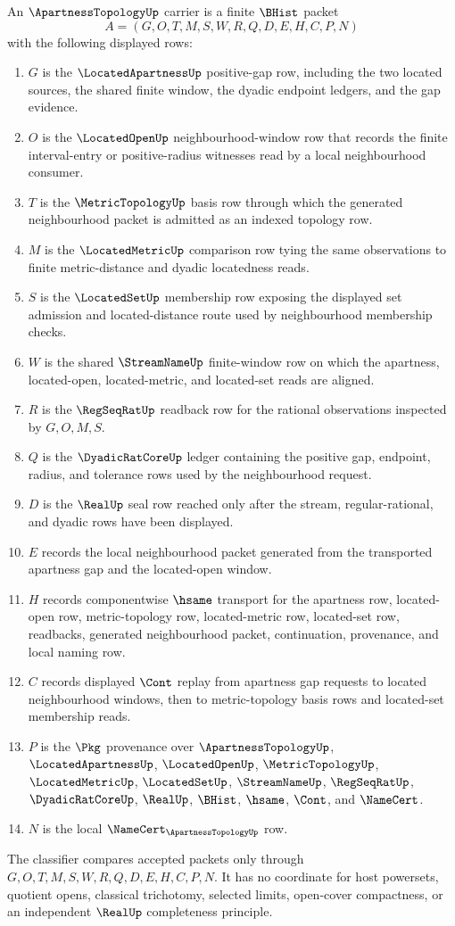 \begin{definition}
\label{def:apartnesstopology-carrier}
An $\ApartnessTopologyUp$ carrier is a finite $\BHist$ packet
$$
A=(G,O,T,M,S,W,R,Q,D,E,H,C,P,N)
$$
with the following displayed rows:
\begin{enumerate}
\item $G$ is the $\LocatedApartnessUp$ positive-gap row, including the two located sources, the shared finite window, the dyadic endpoint ledgers, and the gap evidence.
\item $O$ is the $\LocatedOpenUp$ neighbourhood-window row that records the finite interval-entry or positive-radius witnesses read by a local neighbourhood consumer.
\item $T$ is the $\MetricTopologyUp$ basis row through which the generated neighbourhood packet is admitted as an indexed topology row.
\item $M$ is the $\LocatedMetricUp$ comparison row tying the same observations to finite metric-distance and dyadic locatedness reads.
\item $S$ is the $\LocatedSetUp$ membership row exposing the displayed set admission and located-distance route used by neighbourhood membership checks.
\item $W$ is the shared $\StreamNameUp$ finite-window row on which the apartness, located-open, located-metric, and located-set reads are aligned.
\item $R$ is the $\RegSeqRatUp$ readback row for the rational observations inspected by $G,O,M,S$.
\item $Q$ is the $\DyadicRatCoreUp$ ledger containing the positive gap, endpoint, radius, and tolerance rows used by the neighbourhood request.
\item $D$ is the $\RealUp$ seal row reached only after the stream, regular-rational, and dyadic rows have been displayed.
\item $E$ records the local neighbourhood packet generated from the transported apartness gap and the located-open window.
\item $H$ records componentwise $\hsame$ transport for the apartness row, located-open row, metric-topology row, located-metric row, located-set row, readbacks, generated neighbourhood packet, continuation, provenance, and local naming row.
\item $C$ records displayed $\Cont$ replay from apartness gap requests to located neighbourhood windows, then to metric-topology basis rows and located-set membership reads.
\item $P$ is the $\Pkg$ provenance over $\ApartnessTopologyUp$, $\LocatedApartnessUp$, $\LocatedOpenUp$, $\MetricTopologyUp$, $\LocatedMetricUp$, $\LocatedSetUp$, $\StreamNameUp$, $\RegSeqRatUp$, $\DyadicRatCoreUp$, $\RealUp$, $\BHist$, $\hsame$, $\Cont$, and $\NameCert$.
\item $N$ is the local $\NameCert_{\ApartnessTopologyUp}$ row.
\end{enumerate}
The classifier compares accepted packets only through $G,O,T,M,S,W,R,Q,D,E,H,C,P,N$. It has no coordinate for host powersets, quotient opens, classical trichotomy, selected limits, open-cover compactness, or an independent $\RealUp$ completeness principle.
\end{definition}
